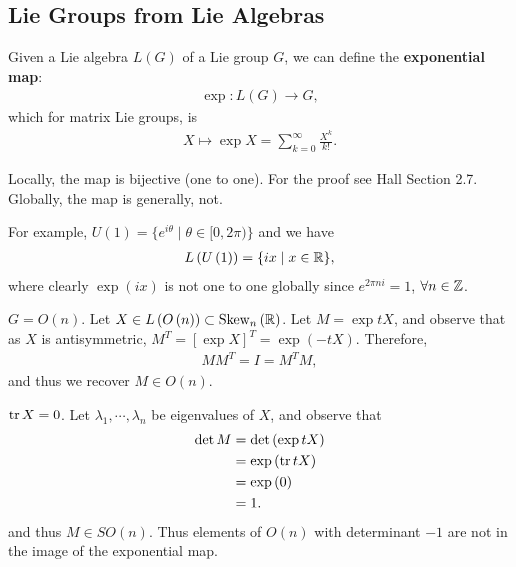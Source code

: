
\newcommand{\id}{\text{id}}

\subsection{Lie Groups from Lie Algebras}

\begin{definition}
    Given a Lie algebra $L\left( G \right)$ of a Lie group $G$, we can define the \textbf{exponential map}:
    \begin{align}
        \exp : L \left( G \right) \to G
    ,\end{align}
    which for matrix Lie groups, is
    \begin{align}
        X \mapsto \exp X = \sum_{k=0}^{\infty}  \frac{X^{k}}{k!}
    .\end{align}
\end{definition}

Locally, the map is bijective (one to one). For the proof see Hall Section 2.7.
Globally, the map is generally, not.

\begin{example}
    For example, $U \left( 1 \right) = \{e^{i \theta}  \mid  \theta \in [ 0,2\pi ) \} $ and we have
    \begin{align}
        L \left( U \left( 1 \right)  \right) = \{i x  \mid  x \in \mathbb{R}\}
    ,\end{align}
    where clearly $\exp \left( ix \right) $ is not one to one globally since $e^{2\pi ni} = 1$, $\forall n \in \mathbb{Z}$.
\end{example}

\begin{example}
    $G = O \left( n \right) $. Let $X \in L \left( O \left( n \right)  \right) \subset \text{Skew}_n\left( \mathbb{R} \right) $. Let $M = \exp t X$, and observe that as $X$ is antisymmetric, $M^{T} = \left[ \exp X \right]^{T} = \exp \left( -tX \right) $. Therefore,
    \begin{align}
        M M^{T} = I = M^{T} M
    ,\end{align}
    and thus we recover $M \in O \left( n \right) $.
\end{example}

\begin{note}
    $\tr X = 0$. Let $\lambda_1, \cdots, \lambda_n$ be eigenvalues of $X$, and observe that
    \begin{align}
        \det M &= \det \left( \exp t X \right)  \\
        &= \exp \left( \tr t X \right)  \\
        &= \exp \left( 0 \right)  \\
        &= 1
    .\end{align}
    and thus $M  \in SO \left( n \right)$. Thus elements of $O \left( n \right) $ with determinant $-1$ are not in the image of the exponential map.
\end{note}

